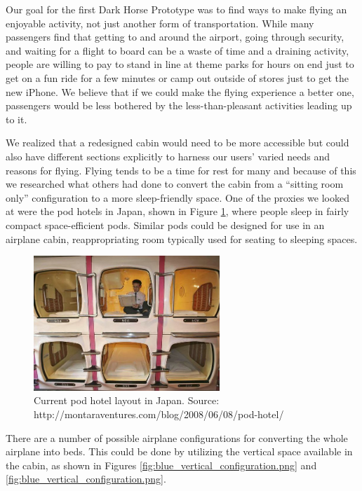 Our goal for the first Dark Horse Prototype was to find ways to make flying an enjoyable activity, not just another form of transportation. While many passengers find that getting to and around the airport, going through security, and waiting for a flight to board can be a waste of time and a draining activity, people are willing to pay to stand in line at theme parks for hours on end just to get on a fun ride for a few minutes or camp out outside of stores just to get the new iPhone. We believe that if we could make the flying experience a better one, passengers would be less bothered by the less-than-pleasant activities leading up to it. 

We realized that a redesigned cabin would need to be more accessible but could also have different sections explicitly to harness our users’ varied needs and reasons for flying. Flying tends to be a time for rest for many and because of this we researched what others had done to convert the cabin from a “sitting room only” configuration to a more sleep-friendly space. One of the proxies we looked at were the pod hotels in Japan, shown in Figure \ref{fig:hotel_pod.jpg}, where people sleep in fairly compact space-efficient pods. Similar pods could be designed for use in an airplane cabin, reappropriating room typically used for seating to sleeping spaces.

\begin{figure}[h]
  \centering
     \includegraphics[width=7cm]{images/hotel_pod.jpg}
   \caption{Current pod hotel layout in Japan. Source: http://montaraventures.com/blog/2008/06/08/pod-hotel/}
  \label{fig:hotel_pod.jpg}
\end{figure}

There are a number of possible airplane configurations for converting the whole airplane into beds. This could be done by utilizing the vertical space available in the cabin, as shown in Figures \ref{fig:blue_vertical_configuration.png} and \ref{fig:blue_vertical_configuration.png}. 

